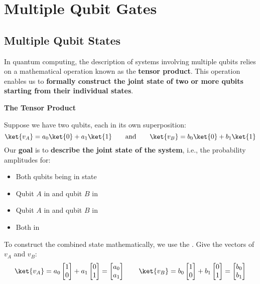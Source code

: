 \section{Multiple Qubit Gates}

\subsection{Multiple Qubit States}

In quantum computing, the description of systems involving multiple qubits relies on a mathematical operation known as the \textbf{tensor product}. This operation enables us to \textbf{formally construct the joint state of two or more qubits starting from their individual states}.

\highspace
\begin{flushleft}
    \textcolor{Green3}{ \textbf{The Tensor Product}}
\end{flushleft}
Suppose we have two qubits, each in its own superposition:
\begin{equation*}
    \ket{v_{A}} = a_{0} \ket{0} + a_{1} \ket{1} \hspace{2em} \text{and} \hspace{2em} \ket{v_{B}} = b_{0} \ket{0} + b_{1}\ket{1}
\end{equation*}
Our \textbf{goal} is to \textbf{describe the joint state of the system}, i.e., the probability amplitudes for:
\begin{itemize}
    \item Both qubits being in state 
    \item Qubit $A$ in  and qubit $B$ in 
    \item Qubit $A$ in  and qubit $B$ in 
    \item Both in 
\end{itemize}
To construct the combined state mathematically, we use the . Give the vectors of $v_{A}$ and $v_{B}$:
\begin{equation*}
    \ket{v_{A}} = a_{0} \begin{bmatrix} 1 \\ 0 \end{bmatrix} + a_{1} \begin{bmatrix} 0 \\ 1 \end{bmatrix} = \begin{bmatrix} a_{0} \\ a_{1} \end{bmatrix}
    \hspace{2em}
    \ket{v_{B}} = b_{0} \begin{bmatrix} 1 \\ 0 \end{bmatrix} + b_{1} \begin{bmatrix} 0 \\ 1 \end{bmatrix} = \begin{bmatrix} b_{0} \\ b_{1} \end{bmatrix}
\end{equation*}
